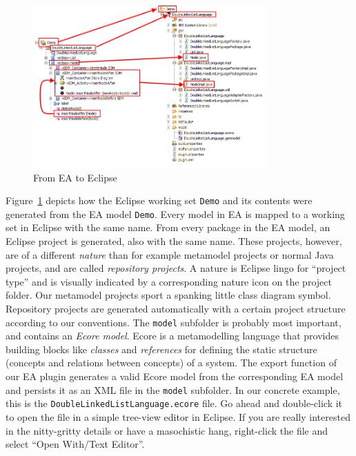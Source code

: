 \begin{figure}[htbp]
	\centering
  \includegraphics[width=0.8\textwidth]{pics/installationAndSetup/bothexplorers}
	\caption{From EA to Eclipse}
	\label{fig_fromEAtoEclipse}
\end{figure}

Figure~\ref{fig_fromEAtoEclipse} depicts how the Eclipse working set
\texttt{Demo} and its contents were generated from the EA model \texttt{Demo}.
Every model in EA is mapped to a working set in Eclipse with the same name. 
From every package in the EA model, an Eclipse project is generated, also with
the same name.  These projects, however, are of a different
\emph{nature} than for example metamodel projects or normal Java projects, and
are called \emph{repository projects}.  A nature is Eclipse lingo for ``project
type'' and is visually indicated by a corresponding nature icon on the project
folder.  Our  metamodel projects sport a spanking little class diagram symbol. 
Repository projects are generated automatically  with a certain project
structure according to our conventions.  The  \texttt{model} subfolder is
probably most important, and contains an  \emph{Ecore model}.  Ecore is a
metamodelling language that provides building  blocks like \emph{classes} and
\emph{references} for defining the  static structure (concepts and relations
between concepts) of a system.  The  export function of our EA plugin generates
a valid Ecore model from the  corresponding EA model and persists it as an XML
file in the \texttt{model}  subfolder.  In our concrete example, this is the
\texttt{DoubleLinkedListLanguage.ecore} file.  Go ahead and double-click it to
open the file in a simple tree-view editor in Eclipse.  If you are really
interested in the nitty-gritty details or have a masochistic hang, right-click
the file and select ``Open With/Text Editor''. 

